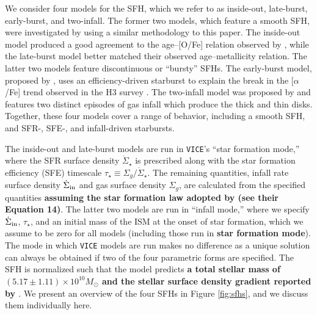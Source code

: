 \documentclass[twocolumn,twocolappendix,linenumbers]{aastex631}
\newcommand{\aFe}{[$\alpha$/Fe]\xspace}
\newcommand{\vice}{{\tt VICE}\xspace}
\begin{document}
We consider four models for the SFH, which we refer to as inside-out, late-burst, early-burst, and two-infall. 
The former two models, which feature a smooth SFH, were investigated by  using a similar methodology to this paper. The inside-out model produced a good agreement to the age--[O/Fe] relation observed by \citet{Feuillet2019-MilkyWayAges}, while the late-burst model better matched their observed age--metallicity relation. The latter two models feature discontinuous or ``bursty'' SFHs. The early-burst model, proposed by \citet{Conroy2022-ThickDisk}, uses an efficiency-driven starburst to explain the break in the \aFe trend observed in the H3 survey \citep{Conroy2019-H3Survey}. The two-infall model was proposed by \citet{Chiappini1997-TwoInfall} and features two distinct episodes of gas infall which produce the thick and thin disks.
Together, these four models cover a range of behavior, including a smooth SFH, and SFR-, SFE-, and infall-driven starbursts.

The inside-out and late-burst models are run in \vice's ``star formation mode,'' where the SFR surface density $\dot\Sigma_\star$ is prescribed along with the star formation efficiency (SFE) timescale $\tau_\star\equiv \Sigma_g/\dot\Sigma_\star$. The remaining quantities, infall rate surface density $\dot\Sigma_{\rm in}$ and gas surface density $\Sigma_g$, are calculated from the specified quantities {\bf assuming the star formation law adopted by  (see their Equation 14)}. The latter two models are run in ``infall mode,'' where we specify $\dot\Sigma_{\rm in}$, $\tau_\star$, and an initial mass of the ISM at the onset of star formation, which we assume to be zero for all models (including those run in {\bf star formation mode}). The mode in which \vice models are run makes no difference as a unique solution can always be obtained if two of the four parametric forms are specified. The SFH is normalized such that the model predicts %
{\bf a total stellar mass of $(5.17\pm1.11)\times10^{10} M_\odot$ \citep{LicquiaNewman2015-StellarMass} and the stellar surface density gradient reported by \citet[][see Appendix B of ]{BlandHawthornGerhard2016-MilkyWayReview}}.
We present an overview of the four SFHs in Figure \ref{fig:sfhs}, and we discuss them individually here.
\end{document}
